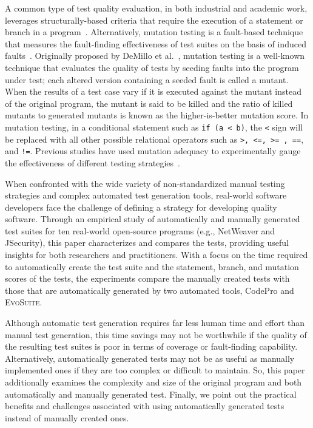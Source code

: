 
A common type of test quality evaluation, in both industrial and academic work, leverages structurally-based criteria that require the execution of a statement or branch in a program~\cite{weyuker1988evaluation}.  Alternatively, mutation testing is a fault-based technique that measures the fault-finding effectiveness of test suites on the basis of induced faults~\cite{demillo1978hints, hamlet1977testing}.  Originally proposed by DeMillo et al.~\cite{demillo1978hints}, mutation testing is a well-known technique that evaluates the quality of tests by seeding faults into the program under test; each altered version containing a seeded fault is called a mutant. When the results of a test case vary if it is executed against the mutant instead of the original program, the mutant is said to be killed and the ratio of killed mutants to generated mutants is known as the higher-is-better mutation score. In mutation testing, in a conditional statement such as \texttt{if (a < b)}, the \texttt{<} sign will be replaced with all other possible relational operators such as \texttt{>, <=, >= , ==}, and \texttt{!=}. Previous studies have used mutation adequacy to experimentally gauge the effectiveness of different testing strategies~\cite{andrews2005mutation,andrews2006,do2006,just2014}.  


When confronted with the wide variety of non-standardized manual testing strategies and complex automated test generation tools, real-world software developers face the challenge of defining a strategy for developing quality software.  Through an empirical study of automatically and manually generated test suites for ten real-world open-source programs (e.g., NetWeaver and JSecurity), this paper characterizes and compares the tests, providing useful insights for both researchers and practitioners. With a focus on the time required to automatically create the test suite and the statement, branch, and mutation scores of the tests, the experiments compare the manually created tests with those that are automatically generated by two automated tools, CodePro and \textsc{EvoSuite}.  


Although automatic test generation requires far less human time and effort than manual test generation, this time savings may not be worthwhile if the quality of the resulting test suites is poor in terms of coverage or fault-finding capability.  Alternatively, automatically generated tests may not be as useful as manually implemented ones if they are too complex or difficult to maintain.  So, this paper additionally examines the complexity and size of the original program and both automatically and manually generated test.  Finally, we point out the practical benefits and challenges associated with using automatically generated tests instead of manually created ones.


